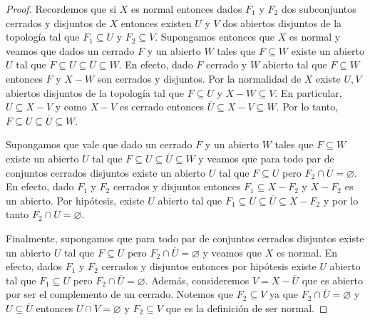 \documentclass{article}
\theoremstyle{definition}
\begin{document}
\begin{proof}
    Recordemos que si \( X \) es normal entonces dados \( F_1 \) y \( F_2 \) dos subconjuntos cerrados y disjuntos de \( X \) entonces existen \( U \) y \( V \) dos abiertos disjuntos de la topología tal que \( F_1 \subseteq U \) y \( F_2 \subseteq V \).
    Supongamos entonces que \( X \) es normal y veamos que dados un cerrado \( F \) y un abierto \( W \) tales que \( F \subseteq W \) existe un abierto \( U \) tal que \( F \subseteq U \subseteq \overline{U} \subseteq W \).
    En efecto, dado \( F \) cerrado y \( W \) abierto tal que \( F \subseteq W \) entonces \( F \) y \( X - W \) son cerrados y disjuntos.
    Por la normalidad de \( X \) existe \( U, V \) abiertos disjuntos de la topología tal que \( F \subseteq U \) y \( X - W \subseteq V \).
    En particular, \( U \subseteq X - V \) y como \( X - V \) es cerrado entonces \( \overline{U} \subseteq X - V \subseteq W \). Por lo tanto, \( F \subseteq U \subseteq \overline{U} \subseteq W \).

    Supongamos que vale que dado un cerrado \( F \) y un abierto \( W \) tales que \( F \subseteq W \) existe un abierto \( U \) tal que \( F \subseteq U \subseteq \overline{U} \subseteq W \) y veamos que para todo par de conjuntos cerrados disjuntos existe un abierto \( U \) tal que \( F \subseteq U \) pero \( F_2 \cap \overline{U} = \varnothing \).
    En efecto, dado \( F_1 \) y \( F_2 \) cerrados y disjuntos entonces \( F_1 \subseteq X - F_2 \) y \( X - F_2 \) es un abierto. Por hipótesis, existe \( U \) abierto tal que \( F_1 \subseteq U \subseteq \overline{U} \subseteq X - F_2 \) y por lo tanto \( F_2 \cap \overline{U} = \varnothing \).

    Finalmente, supongamos que para todo par de conjuntos cerrados disjuntos existe un abierto \( U \) tal que \( F \subseteq U \) pero \( F_2 \cap \overline{U} = \varnothing \) y veamos que \( X \) es normal.
    En efecto, dados \( F_1 \) y \( F_2 \) cerrados y disjuntos entonces por hipótesis existe \( U \) abierto tal que \( F_1 \subseteq U \) pero \( F_2 \cap \overline{U} = \varnothing \).
    Además, consideremos \( V = X - \overline{U} \) que es abierto por ser el complemento de un cerrado. Notemos que \( F_2 \subseteq V \) ya que \( F_2 \cap \overline{U} = \varnothing \) y \( U \subseteq \overline{U} \)
    entonces \( U \cap V = \varnothing \) y \( F_2 \subseteq V \) que es la definición de ser normal.
\end{proof}
\end{document}
